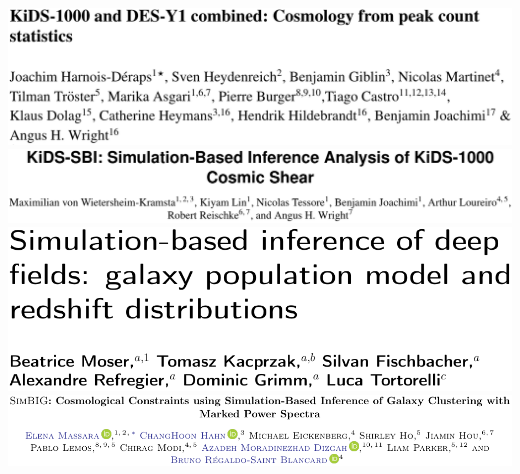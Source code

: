 \documentclass[aspectratio=169]{beamer}
\begin{document}
\begin{frame}
\begin{columns}
        \includegraphics[width=\textwidth]{figures/sbi_papers/kidsdes.pdf}
        \vspace{10pt}\\
        \includegraphics[width=\textwidth]{figures/sbi_papers/kids.pdf}
        \vspace{10pt}\\
        \includegraphics[width=\textwidth]{figures/sbi_papers/population.pdf}
        \vspace{10pt}\\
        \includegraphics[width=\textwidth]{figures/sbi_papers/simbig.pdf}
    \end{columns}
\end{frame}
\end{document}
